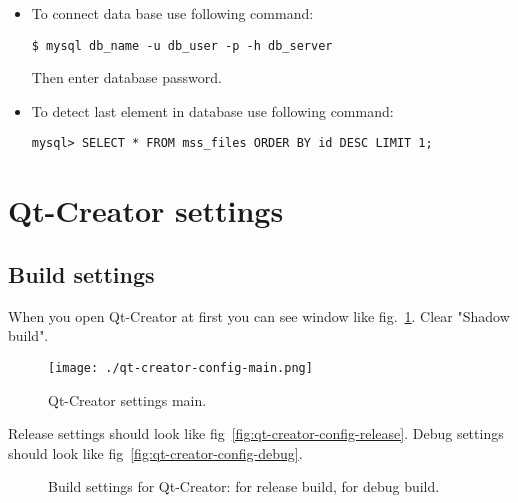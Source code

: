 \begin{itemize}

\item To connect data base use following command:

\begin{lstlisting}
$ mysql db_name -u db_user -p -h db_server
\end{lstlisting}

Then enter database password.

\item To detect last element in database use following command:

\begin{lstlisting}
mysql> SELECT * FROM mss_files ORDER BY id DESC LIMIT 1;
\end{lstlisting}

\end{itemize}

\section{Qt-Creator settings}

\subsection{Build settings}\label{sec:qt-build}

When you open Qt-Creator at first you can see window like fig.~\ref{fig:qt-creator-config-main}. Clear "Shadow build".

\begin{figure}[htp]
  \centering
  \texttt{[image: ./qt-creator-config-main.png]}
  \caption{Qt-Creator settings main.}
  \label{fig:qt-creator-config-main}
\end{figure}

Release settings should look like fig~\ref{fig:qt-creator-config-release}. Debug settings should look like fig~\ref{fig:qt-creator-config-debug}.

\begin{figure}[htb]
  \centering
  \caption{Build settings for Qt-Creator:  for release build,  for debug build.}
\end{figure}

